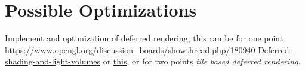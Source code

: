 \documentclass[12pt]{article}
\begin{document}
\section{Possible Optimizations}
Implement and optimization of deferred rendering, this can be for one point \href{deferred illumination}{https://www.opengl.org/discussion_boards/showthread.php/180940-Deferred-shading-and-light-volumes}
or \href{http://ogldev.atspace.co.uk/www/tutorial37/tutorial37.html}{this}, or for two points \textit{tile based deferred rendering}.



\end{document}
